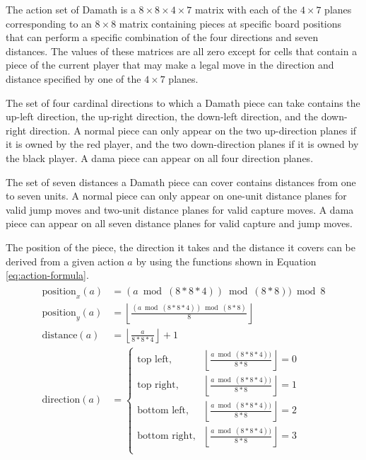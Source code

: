 The action set of Damath is a $8 \times 8 \times 4 \times 7$ matrix with each of the $4 \times 7$ planes corresponding to an $8 \times 8$ matrix containing pieces at specific board positions that can perform a specific combination of the four directions and seven distances. The values of these matrices are all zero except for cells that contain a piece of the current player that may make a legal move in the direction and distance specified by one of the $4 \times 7$ planes.

The set of four cardinal directions to which a Damath piece can take contains the up-left direction, the up-right direction, the down-left direction, and the down-right direction. A normal piece can only appear on the two up-direction planes if it is owned by the red player, and the two down-direction planes if it is owned by the black player. A dama piece can appear on all four direction planes.

The set of seven distances a Damath piece can cover contains distances from one to seven units. A normal piece can only appear on one-unit distance planes for valid jump moves and two-unit distance planes for valid capture moves. A dama piece can appear on all seven distance planes for valid capture and jump moves. 

The position of the piece, the direction it takes and the distance it covers can be derived from a given action $a$ by using the functions shown in Equation \ref{eq:action-formula}.
\begin{align} 
    \begin{split}
        \text{position}_x(a) &= (a \bmod (8 * 8 * 4)) \bmod (8 * 8)) \bmod 8 \\
        \text{position}_y(a) &= \left\lfloor \frac{(a \bmod (8 * 8 * 4)) \bmod (8 * 8)}{8} \right\rfloor\\
        \text{distance}(a) &= \left\lfloor \frac{a}{8 * 8 * 4}\right\rfloor + 1 \\
        \text{direction}(a) &= 
        \begin{cases}
            \text{top left}, & \left\lfloor \frac{a \bmod (8 * 8 * 4))}{8 * 8} \right\rfloor = 0 \\
            \text{top right}, & \left\lfloor \frac{a \bmod (8 * 8 * 4))}{8 * 8} \right\rfloor = 1\\
            \text{bottom left}, & \left\lfloor \frac{a \bmod (8 * 8 * 4))}{8 * 8} \right\rfloor = 2\\
            \text{bottom right}, & \left\lfloor \frac{a \bmod (8 * 8 * 4))}{8 * 8} \right\rfloor = 3\\
        \end{cases}
    \end{split}
    \label{eq:action-formula}
\end{align}

